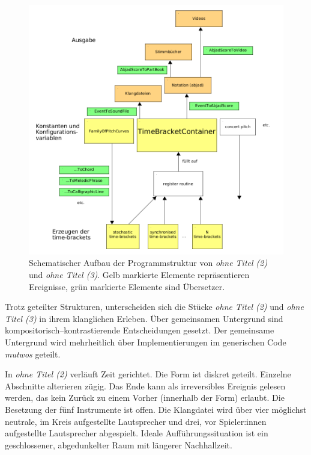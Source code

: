 \documentclass[12pt,a4paper,ngerman]{article}
\begin{document}
\begin{figure}[h!]
    \begin{center}
        \includegraphics[scale=0.42]{pictures/ohne-titel-mutwo-structure.png}
    \end{center}
    \caption{%
        Schematischer Aufbau der Programmstruktur von \emph{ohne Titel (2)} und  \emph{ohne Titel (3)}.
        Gelb markierte Elemente repräsentieren Ereignisse, grün markierte Elemente sind Übersetzer.
    }
    \label{fig:ohneTitelMutwoStructure}
\end{figure}


Trotz geteilter Strukturen, unterscheiden sich die Stücke \emph{ohne Titel (2)} und  \emph{ohne Titel (3)} in ihrem klanglichen Erleben.
Über gemeinsamen Untergrund sind kompositorisch--kontrastierende Entscheidungen gesetzt.
Der gemeinsame Untergrund wird mehrheitlich über Implementierungen im generischen Code \emph{mutwos} geteilt.

\smallskip

In \emph{ohne Titel (2)} verläuft Zeit gerichtet.
Die Form ist diskret geteilt.
Einzelne Abschnitte alterieren zügig.
Das Ende kann als irreversibles Ereignis gelesen werden, das kein Zurück zu einem Vorher (innerhalb der Form) erlaubt.
Die Besetzung der fünf Instrumente ist offen.
Die Klangdatei wird über vier möglichst neutrale, im Kreis aufgestellte Lautsprecher und drei, vor Spieler:innen aufgestellte Lautsprecher abgespielt.
Ideale Aufführungssituation ist ein geschlossener, abgedunkelter Raum mit längerer Nachhallzeit.
\end{document}
